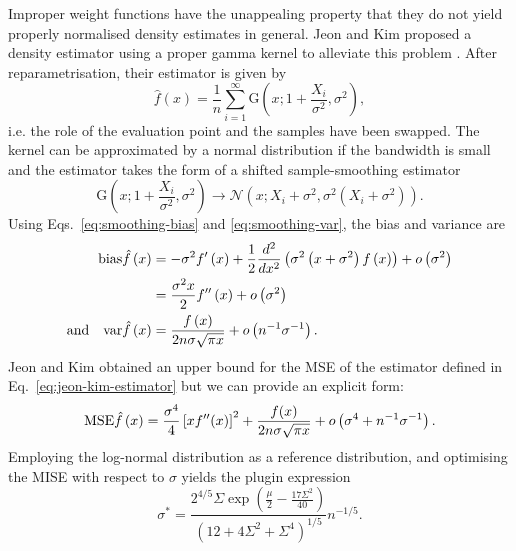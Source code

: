 Improper weight functions have the unappealing property that they do not yield properly normalised density estimates in general. Jeon and Kim proposed a density estimator using a proper gamma kernel to alleviate this problem \cite{Jeon2014}. After reparametrisation, their estimator is given by
\begin{equation}
\hat{f}\left(x\right)=\frac{1}{n}\sum_{i=1}^{\infty}\mathrm{G}\left(x;1+\frac{X_{i}}{\sigma^{2}},\sigma^{2}\right),\label{eq:jeon-kim-estimator}
\end{equation}
i.e. the role of the evaluation point and the samples have been swapped. The kernel can be approximated by a normal distribution if the bandwidth is small and the estimator takes the form of a shifted sample-smoothing estimator
\[
\mathrm{G}\left(x;1+\frac{X_{i}}{\sigma^{2}},\sigma^{2}\right)\rightarrow\mathcal{N}\left(x;X_{i}+\sigma^{2},\sigma^{2}\left(X_{i}+\sigma^{2}\right)\right).
\]
Using Eqs.~\eqref{eq:smoothing-bias} and \eqref{eq:smoothing-var}, the bias and variance are
\begin{align*}
\mathrm{bias}\hat{f}\left(x\right) & =-\sigma^{2}f'\left(x\right)+\frac{1}{2}\frac{d^{2}}{dx^{2}}\left(\sigma^{2}\left(x+\sigma^{2}\right)f\left(x\right)\right)+o\left(\sigma^{2}\right)\\
 & =\frac{\sigma^{2}x}{2}f''\left(x\right)+o\left(\sigma^{2}\right)\\
\text{and}\quad\mathrm{var}\hat{f}\left(x\right) & =\frac{f\left(x\right)}{2n\sigma\sqrt{\pi x}}+o\left(n^{-1}\sigma^{-1}\right).
\end{align*}
Jeon and Kim obtained an upper bound for the MSE of the estimator defined in Eq.~\eqref{eq:jeon-kim-estimator} but we can provide an explicit form: 
\[
\mathrm{MSE}\hat{f}\left(x\right)=\frac{\sigma^{4}}{4}\left[xf''(x)\right]^{2}+\frac{f(x)}{2n\sigma\sqrt{\pi x}}+o\left(\sigma^{4}+n^{-1}\sigma^{-1}\right).
\]
Employing the log-normal distribution as a reference distribution, and optimising the MISE with respect to $\sigma$ yields the plugin expression 
\[
\sigma^{*}=\frac{2^{4/5}\Sigma\exp\left(\frac{\mu}{2}-\frac{17\Sigma^{2}}{40}\right)}{\left(12+4\Sigma^{2}+\Sigma^{4}\right)^{1/5}}n^{-1/5}.
\]


